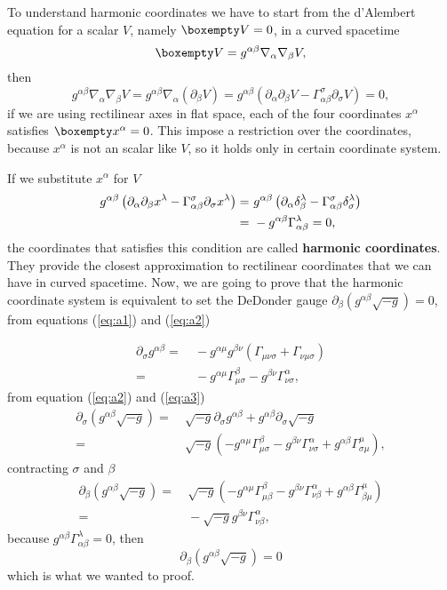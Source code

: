\begin{appendix}
To understand harmonic coordinates we have to start from the d'Alembert
equation for a scalar $V$, namely $\boxempty V=0$, in a curved spacetime
\[
\boxempty V=g^{\alpha\beta}\nabla_{\alpha}\nabla_{\beta}V,
\]
then
\[
g^{\alpha\beta}\nabla_{\alpha}\nabla_{\beta}V=g^{\alpha\beta}\nabla_{\alpha}\left(\partial_{\beta}V\right)=g^{\alpha\beta}\left(\partial_{\alpha}\partial_{\beta}V-\Gamma_{\alpha\beta}^{\sigma}\partial_{\sigma}V\right)=0,
\]
if we are using rectilinear axes in flat space, each of the four coordinates
$x^{\alpha}$ satisfies $\boxempty x^{\alpha}=0$. This impose a restriction
over the coordinates, because $x^{\alpha}$ is not an scalar like
$V$, so it holds only in certain coordinate system.

If we substitute $x^{\alpha}$ for $V$
\begin{align*}
g^{\alpha\beta}\left(\partial_{\alpha}\partial_{\beta}x^{\lambda}-\Gamma_{\alpha\beta}^{\sigma}\partial_{\sigma}x^{\lambda}\right)= & \ g^{\alpha\beta}\left(\partial_{\alpha}\delta_{\text{\ensuremath{\beta}}}^{\lambda}-\Gamma_{\alpha\beta}^{\sigma}\delta_{\text{\ensuremath{\sigma}}}^{\lambda}\right)\\
= & \ -g^{\alpha\beta}\Gamma_{\alpha\beta}^{\lambda}=0,
\end{align*}
the coordinates that satisfies this condition are called \textbf{harmonic
coordinates}. They provide the closest approximation to rectilinear
coordinates that we can have in curved spacetime. Now, we are going
to prove that the harmonic coordinate system is equivalent to set
the DeDonder gauge $\partial_{\beta}\left(g^{\alpha\beta}\sqrt{-g}\right)=0$,
from equations (\ref{eq:a1}) and (\ref{eq:a2})

\begin{align*}
\partial_{\sigma}g^{\alpha\beta}= & \ -g^{\alpha\mu}g^{\beta\nu}\left(\Gamma_{\mu\nu\sigma}+\Gamma_{\nu\mu\sigma}\right)\\
= & \ -g^{\alpha\mu}\Gamma_{\mu\sigma}^{\beta}-g^{\beta\nu}\Gamma_{\nu\sigma}^{\alpha},
\end{align*}
from equation (\ref{eq:a2}) and (\ref{eq:a3}) 
\begin{align*}
\partial_{\sigma}\left(g^{\alpha\beta}\sqrt{-g}\right)= & \ \sqrt{-g}\partial_{\sigma}g^{\alpha\beta}+g^{\alpha\beta}\partial_{\sigma}\sqrt{-g}\\
= & \ \sqrt{-g}\left(-g^{\alpha\mu}\Gamma_{\mu\sigma}^{\beta}-g^{\beta\nu}\Gamma_{\nu\sigma}^{\alpha}+g^{\alpha\beta}\Gamma_{\sigma\mu}^{\mu}\right),
\end{align*}
contracting $\sigma$ and $\beta$
\begin{align*}
\partial_{\beta}\left(g^{\alpha\beta}\sqrt{-g}\right)= & \ \sqrt{-g}\left(-g^{\alpha\mu}\Gamma_{\mu\beta}^{\beta}-g^{\beta\nu}\Gamma_{\nu\beta}^{\alpha}+g^{\alpha\beta}\Gamma_{\beta\mu}^{\mu}\right)\\
= & \ -\sqrt{-g}g^{\beta\nu}\Gamma_{\nu\beta}^{\alpha},
\end{align*}
because $g^{\alpha\beta}\Gamma_{\alpha\beta}^{\lambda}=0$, then
\[
\partial_{\beta}\left(g^{\alpha\beta}\sqrt{-g}\right)=0
\]
which is what we wanted to proof.

\end{appendix}
